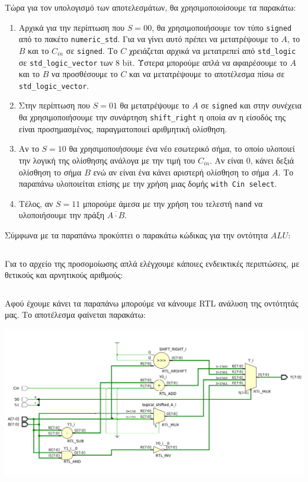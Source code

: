 \documentclass[11pt, a4paper]{report}
\begin{document}
Τώρα για τον υπολογισμό των αποτελεσμάτων, θα χρησιμοποιοίσουμε τα παρακάτω:
\begin{enumerate}
	\item Αρχικά για την περίπτωση που $S = 00$, θα χρησιμοποιήσουμε τον τύπο \texttt{signed} από το πακέτο \texttt{numeric_std}.
	      Για να γίνει αυτό πρέπει να μετατρέψουμε το $A$, το $B$ και το $C_{in}$ σε \texttt{signed}.
	      Το $C$ χρειάζεται αρχικά να μετατρεπεί από \texttt{std_logic} σε \texttt{std_logic_vector} των 8 bit.
	      Ύστερα μπορούμε απλά να αφαιρέσουμε το $A$ και το $B$ να προσθέσουμε το $C$ και να μετατρέψουμε το αποτέλεσμα πίσω σε \texttt{std_logic_vector}.
	\item Στην περίπτωση που $S = 01$ θα μετατρέψουμε το $A$ σε \texttt{signed} και στην συνέχεια θα χρησιμοποιήσουμε την συνάρτηση
	      \texttt{shift_right} η οποία αν η είσοδός της είναι προσημασμένος, παραγματοποιεί αριθμητική ολίσθηση.
	\item Αν το $S = 10$ θα χρησιμοποιήσουμε ένα νέο εσωτερικό σήμα, το οποίο υλοποιεί την λογική της ολίσθησης ανάλογα με την τιμή του $C_{in}$.
	      Αν είναι 0, κάνει δεξιά ολίσθηση το σήμα $B$ ενώ αν είναι ένα κάνει αριστερή ολίσθηση το σήμα $A$. Το παραπάνω υλοποιείται επίσης με την χρήση μιας δομής \texttt{with Cin select}.
	\item Τέλος, αν $S = 11$ μπορούμε άμεσα με την χρήση του τελεστή \texttt{nand} να υλοποιήσουμε την πράξη $\overline{A \cdot B}$.
\end{enumerate}

Σύμφωνα με τα παραπάνω προκύπτει ο παρακάτω κώδικας για την οντότητα $ALU$:
\inputminted[breaklines, linenos]{vhdl}{./code/part-2/alu-1/alu.vhdl}

Για το αρχείο της προσομοίωσης απλά ελέγχουμε κάποιες ενδεικτικές περιπτώσεις, με θετικούς και αρνητικούς αριθμούς:
\inputminted[breaklines, linenos]{vhdl}{./code/part-2/alu-1/alu_tb.vhdl}

\newpage

Αφού έχουμε κάνει τα παραπάνω μπορούμε να κάνουμε RTL ανάλυση της οντότητάς μας. Το αποτέλεσμα φαίνεται παρακάτω:
\begin{center}
	\includegraphics[width=\textwidth]{./images/alu-1/RLT_ALU.png}
\end{center}
\end{document}
